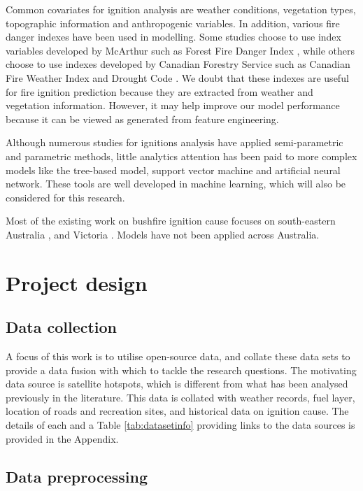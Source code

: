 \documentclass[11pt,a4paper,]{article}
\begin{document}
Common covariates for ignition analysis are weather conditions, vegetation types, topographic information and anthropogenic variables. In addition, various fire danger indexes have been used in modelling. Some studies choose to use index variables developed by McArthur such as Forest Fire Danger Index \autocite{clarke2019developing,read2018lightning}, while others choose to use indexes developed by Canadian Forestry Service such as Canadian Fire Weather Index and Drought Code \autocite{plucinski2014predicting}. We doubt that these indexes are useful for fire ignition prediction because they are extracted from weather and vegetation information. However, it may help improve our model performance because it can be viewed as generated from feature engineering.

Although numerous studies for ignitions analysis have applied semi-parametric and parametric methods, little analytics attention has been paid to more complex models like the tree-based model, support vector machine and artificial neural network. These tools are well developed in machine learning, which will also be considered for this research.

Most of the existing work on bushfire ignition cause focuses on south-eastern Australia \autocite{clarke2019developing}, and Victoria \autocite{read2018lightning}. Models have not been applied across Australia.

\hypertarget{project-design}{%
\section{Project design}\label{project-design}}

\hypertarget{data-collection}{%
\subsection{Data collection}\label{data-collection}}

A focus of this work is to utilise open-source data, and collate these data sets to provide a data fusion with which to tackle the research questions. The motivating data source is satellite hotspots, which is different from what has been analysed previously in the literature. This data is collated with weather records, fuel layer, location of roads and recreation sites, and historical data on ignition cause. The details of each and a Table \ref{tab:datasetinfo} providing links to the data sources is provided in the Appendix.

\hypertarget{data-preprocessing}{%
\subsection{Data preprocessing}\label{data-preprocessing}}
\end{document}
